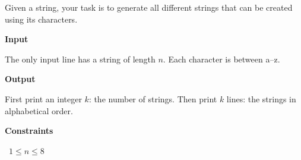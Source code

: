 Given a string, your task is to generate all different strings that can be created using its characters.

\vspace{0.3cm}\noindent\textbf{Input}

The only input line has a string of length $n$. Each character is between a–z.

\vspace{0.3cm}\noindent\textbf{Output}

First print an integer $k$: the number of strings. Then print $k$ lines: the strings in alphabetical order.

\vspace{0.3cm}\noindent\textbf{Constraints}

\textbullet\ $1 \le n \le 8$
